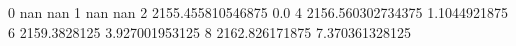 0 nan nan
1 nan nan
2 2155.455810546875 0.0
4 2156.560302734375 1.1044921875
6 2159.3828125 3.927001953125
8 2162.826171875 7.370361328125
